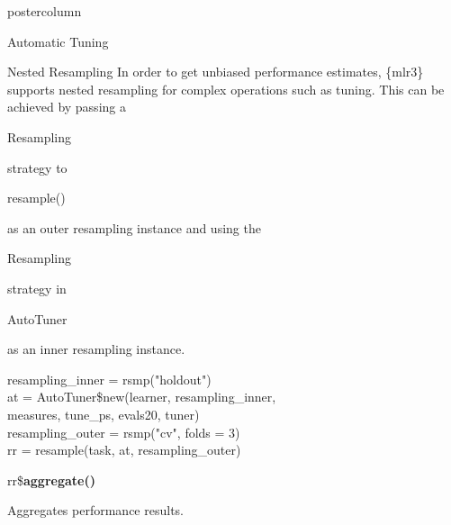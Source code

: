 \documentclass{beamer}
\newcommand{\codeinline}[1]{\begin{codeboxinline}#1\end{codeboxinline}}
\begin{document}
\begin{frame}[fragile]{}
\begin{columns}
\begin{column}{.245\textwidth}
\begin{beamercolorbox}[center]{postercolumn}
\begin{minipage}{.98\textwidth}
{\begin{myblock}{Automatic Tuning}
						\end{myblock}
						\begin{myblock}{Nested Resampling}
							In order to get unbiased performance estimates, 
							\{mlr3\} supports nested resampling for complex operations such as tuning.
							This can be achieved by passing a \codeinline{Resampling} strategy to
							\codeinline{resample()} as an outer resampling instance and using the 
							\codeinline{Resampling} strategy in \codeinline{AutoTuner} as an 
							inner resampling instance.
							\\
							\begin{codeboxexample}
								\footnotesize{
									resampling\_inner = rsmp("holdout")
									\vspace{1em}
									\\
									at = AutoTuner\$new(learner, resampling\_inner, \\
									\hspace*{1ex}measures, tune\_ps, evals20, tuner)
									\vspace{1em}
									\\
									resampling\_outer = rsmp("cv", folds = 3)\\
									rr = resample(task, at, resampling\_outer)
								}
							\end{codeboxexample}
							\vspace{1em}
							\begin{codebox}
								rr\$\textbf{aggregate()}
							\end{codebox}
							Aggregates performance results.
						\end{myblock}
						\vfill}
				\end{minipage}
			\end{beamercolorbox}
		\end{column}
	\end{columns}
\end{frame}
\end{document}
